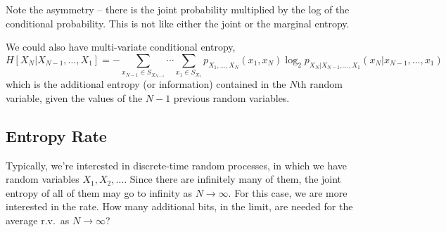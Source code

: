 

Note the asymmetry -- there is the joint probability multiplied by
the log of the conditional probability.  This is not like either the
joint or the marginal entropy.

We could also have multi-variate conditional entropy,
\[
  H[X_N | X_{N-1}, \ldots, X_1] = - \sum_{x_{N-1} \in S_{X_{N-1}}} \cdots \sum_{x_1 \in S_{X_1}}
        p_{X_1,\ldots, X_N}(x_1, x_N) \log_2 p_{X_N|X_{N-1}, \ldots, X_1}(x_N| x_{N-1}, \ldots, x_1)
\]
which is the additional entropy (or information) contained in the
$N$th random variable, given the values of the $N-1$ previous random
variables.

\subsection{Entropy Rate}

Typically, we're interested in discrete-time random processes, in
which we have random variables $X_1, X_2, \ldots$.  Since there are
infinitely many of them, the joint entropy of all of them may go to
infinity as $N\rightarrow \infty$.  For this case, we are more
interested in the rate.  How many additional bits, in the limit, are
needed for the average r.v.\ as $N\rightarrow \infty$?


